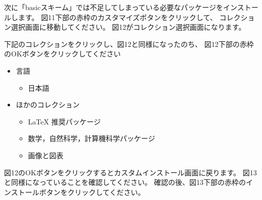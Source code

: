 \documentclass[dvipdfmx]{jsarticle}
\begin{document}
次に「basicスキーム」では不足してしまっている必要なパッケージをインストールします。
図11下部の赤枠のカスタマイズボタンをクリックして、
コレクション選択画面に移動してください。
図12がコレクション選択画面になります。

下記のコレクションをクリックし、図12と同様になったのち、
図12下部の赤枠のOKボタンをクリックしてください


\begin{itemize}
    \item 言語
    \begin{itemize}
        \item 日本語
    \end{itemize}
    \item ほかのコレクション
    \begin{itemize}
        \item LaTeX 推奨パッケージ
        \item 数学，自然科学，計算機科学パッケージ
        \item 画像と図表
    \end{itemize}
\end{itemize}

図12のOKボタンをクリックするとカスタムインストール画面に戻ります。
図13と同様になっていることを確認してください。
確認の後、図13下部の赤枠のインストールボタンをクリックしてください。
\end{document}
